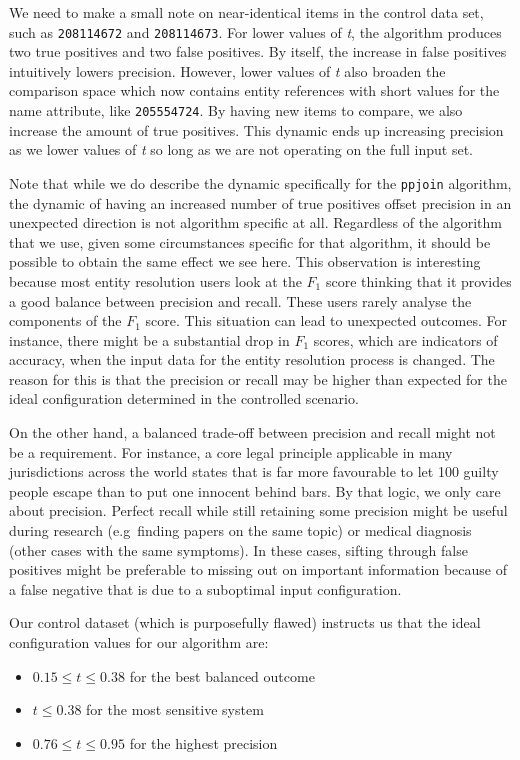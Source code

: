 We need to make a small note on near-identical items in the control data set,
such as \texttt{208114672} and \texttt{208114673}.
For lower values of \textit{t}, the algorithm produces two true positives and
two false positives.
By itself, the increase in false positives intuitively lowers precision.
However, lower values of \textit{t} also broaden the comparison space which
now contains entity references with short values for the name attribute,
like \texttt{205554724}.
By having new items to compare, we also increase the amount of true positives.
This dynamic ends up increasing precision as we lower values of \textit{t} so
long as we are not operating on the full input set.

Note that while we do describe the dynamic specifically for the \texttt{ppjoin}
algorithm, the dynamic of having an increased number of true positives offset
precision in an unexpected direction is not algorithm specific at all.
Regardless of the algorithm that we use, given some circumstances specific for
that algorithm, it should be possible to obtain the same effect we see here.
This observation is interesting because most entity resolution users look at the
$F_1$ score thinking that it provides a good balance between precision and recall.
These users rarely analyse the components of the $F_1$ score.
This situation can lead to unexpected outcomes.
For instance, there might be a substantial drop in $F_1$ scores, which are
indicators of accuracy, when the input data for the entity resolution process is
changed.
The reason for this is that the precision or recall may be higher than expected
for the ideal configuration determined in the controlled scenario.

On the other hand, a balanced trade-off between precision and recall might not
be a requirement.
For instance, a core legal principle applicable in many jurisdictions across the
world states that is far more favourable to let 100 guilty people escape than to
put one innocent behind bars.
By that logic, we only care about precision.
Perfect recall while still retaining some precision might be useful during
research (e.g~finding papers on the same topic) or medical diagnosis (other
cases with the same symptoms).
In these cases, sifting through false positives might be preferable to missing
out on important information because of a false negative that is due to a
suboptimal input configuration.

Our control dataset (which is purposefully flawed) instructs us that the ideal
configuration values for our algorithm are:
\begin{itemize}
    \item $0.15 \leq t \leq 0.38$ for the best balanced outcome
    \item $t \leq 0.38$ for the most sensitive system
    \item $0.76 \leq t \leq 0.95$ for the highest precision
\end{itemize}

